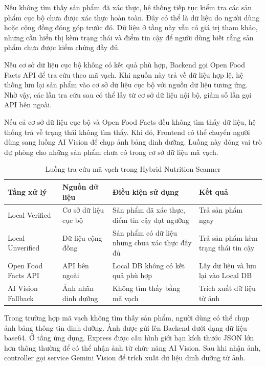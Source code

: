 Nếu không tìm thấy sản phẩm đã xác thực, hệ thống tiếp tục kiểm tra các sản phẩm cục bộ chưa được xác thực hoàn toàn. Đây có thể là dữ liệu do người dùng hoặc cộng đồng đóng góp trước đó. Dữ liệu ở tầng này vẫn có giá trị tham khảo, nhưng cần hiển thị kèm trạng thái và điểm tin cậy để người dùng biết rằng sản phẩm chưa được kiểm chứng đầy đủ.

Nếu cơ sở dữ liệu cục bộ không có kết quả phù hợp, Backend gọi Open Food Facts API để tra cứu theo mã vạch. Khi nguồn này trả về dữ liệu hợp lệ, hệ thống lưu lại sản phẩm vào cơ sở dữ liệu cục bộ với nguồn dữ liệu tương ứng. Nhờ vậy, các lần tra cứu sau có thể lấy từ cơ sở dữ liệu nội bộ, giảm số lần gọi API bên ngoài.

Nếu cả cơ sở dữ liệu cục bộ và Open Food Facts đều không tìm thấy dữ liệu, hệ thống trả về trạng thái không tìm thấy. Khi đó, Frontend có thể chuyển người dùng sang luồng AI Vision để chụp ảnh bảng dinh dưỡng. Luồng này đóng vai trò dự phòng cho những sản phẩm chưa có trong cơ sở dữ liệu mã vạch.

\begin{table}[H]
\centering
\caption{Luồng tra cứu mã vạch trong Hybrid Nutrition Scanner}
\begin{tabular}{|p{3cm}|p{4cm}|p{4cm}|p{4cm}|}
\hline
\textbf{Tầng xử lý} & \textbf{Nguồn dữ liệu} & \textbf{Điều kiện sử dụng} & \textbf{Kết quả} \\ \hline
Local Verified & Cơ sở dữ liệu cục bộ & Sản phẩm đã xác thực, điểm tin cậy đạt ngưỡng & Trả sản phẩm ngay \\ \hline
Local Unverified & Dữ liệu cộng đồng & Sản phẩm có dữ liệu nhưng chưa xác thực đầy đủ & Trả sản phẩm kèm trạng thái tin cậy \\ \hline
Open Food Facts API & API bên ngoài & Local DB không có kết quả phù hợp & Lấy dữ liệu và lưu lại vào Local DB \\ \hline
AI Vision Fallback & Ảnh nhãn dinh dưỡng & Không tìm thấy bằng mã vạch & Trích xuất dữ liệu từ ảnh \\ \hline
\end{tabular}
\end{table}

Trong trường hợp mã vạch không tìm thấy sản phẩm, người dùng có thể chụp ảnh bảng thông tin dinh dưỡng. Ảnh được gửi lên Backend dưới dạng dữ liệu base64. Ở tầng ứng dụng, Express được cấu hình giới hạn kích thước JSON lớn hơn thông thường để có thể nhận ảnh từ chức năng AI Vision. Sau khi nhận ảnh, controller gọi service Gemini Vision để trích xuất dữ liệu dinh dưỡng từ ảnh.

